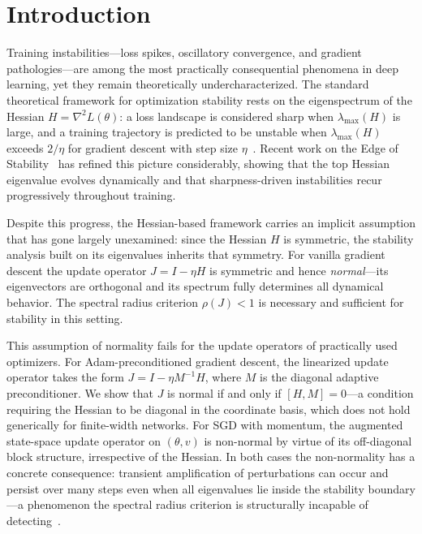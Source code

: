 \documentclass[aps,prresearch,twocolumn,superscriptaddress,longbibliography]{revtex4-2}
\begin{document}
\section{Introduction}
\label{sec:intro}

Training instabilities---loss spikes, oscillatory convergence, and
gradient pathologies---are among the most practically consequential
phenomena in deep learning, yet they remain theoretically
undercharacterized.
The standard theoretical framework for optimization stability rests on
the eigenspectrum of the Hessian $H = \nabla^2 L(\theta)$: a loss
landscape is considered sharp when $\lambda_{\max}(H)$ is large, and a
training trajectory is predicted to be unstable when $\lambda_{\max}(H)$
exceeds $2/\eta$ for gradient descent with step size $\eta$~\cite{bottou2012}.
Recent work on the Edge of Stability~\cite{cohen2022,damian2023} has
refined this picture considerably, showing that the top Hessian
eigenvalue evolves dynamically and that sharpness-driven instabilities
recur progressively throughout training.

Despite this progress, the Hessian-based framework carries an implicit
assumption that has gone largely unexamined: since the Hessian $H$ is
symmetric, the stability analysis built on its eigenvalues inherits that
symmetry.
For vanilla gradient descent the update operator $J = I - \eta H$ is
symmetric and hence \emph{normal}---its eigenvectors are orthogonal and
its spectrum fully determines all dynamical behavior.
The spectral radius criterion $\rho(J) < 1$ is necessary and sufficient
for stability in this setting.

This assumption of normality fails for the update operators of
practically used optimizers.
For Adam-preconditioned gradient descent, the linearized update operator
takes the form $J = I - \eta M^{-1}H$, where $M$ is the diagonal
adaptive preconditioner.
We show that $J$ is normal if and only if $[H, M] = 0$---a condition
requiring the Hessian to be diagonal in the coordinate basis, which does
not hold generically for finite-width networks.
For SGD with momentum, the augmented state-space update operator on
$(\theta, v)$ is non-normal by virtue of its off-diagonal block
structure, irrespective of the Hessian.
In both cases the non-normality has a concrete consequence: transient
amplification of perturbations can occur and persist over many steps
even when all eigenvalues lie inside the stability boundary---a
phenomenon the spectral radius criterion is structurally incapable of
detecting~\cite{trefethen2005,trefethen1993}.
\end{document}
